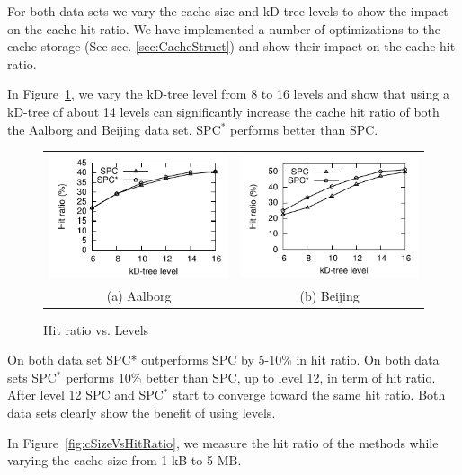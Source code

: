 For both data sets we vary the cache size and kD-tree levels to show the impact on the cache hit ratio. We have implemented a number of optimizations to the cache storage (See sec. \ref{sec:CacheStruct}) and show their impact on the cache hit ratio.


%
In Figure~\ref{fig:levelVsHitRatio}, we vary the kD-tree level from 8 to 16 levels and show that using a kD-tree of about 14 levels can significantly increase the cache hit ratio of both the Aalborg and Beijing data set. SPC$^*$ performs better than SPC.


\begin{figure}[htb]
\center
  \begin{tabular}{@{}c@{ }c@{}}
     \includegraphics[width=0.5\columnwidth]{figures/split_hitratio_aal.pdf}
     &
     \includegraphics[width=0.5\columnwidth]{figures/split_hitratio_bei.pdf}
      \\
     (a) Aalborg & (b)  Beijing
     \end{tabular}
\caption{Hit ratio vs. Levels}
\label{fig:levelVsHitRatio}
\end{figure}

{\color{red}
On both data set SPC* outperforms SPC by 5-10\% in hit ratio. On both data sets SPC$^*$ performs 10\% better than SPC, up to level 12, in term of hit ratio. After level 12 SPC and SPC$^*$ start to converge toward the same hit ratio. Both data sets clearly show the benefit of using levels.
}



%
In Figure~\ref{fig:cSizeVsHitRatio}, we measure the hit ratio of the methods
while varying the cache size from 1 kB to 5 MB.


